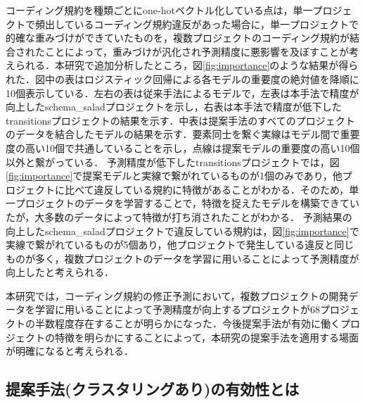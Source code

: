 \documentclass[submit,noauthor,ses,dvipdfmx]{ipsj}
\begin{document}
コーディング規約を種類ごとにone-hotベクトル化している点は，単一プロジェクトで頻出しているコーディング規約違反があった場合に，単一プロジェクトで的確な重みづけができていたものを，複数プロジェクトのコーディング規約が結合されたことによって，重みづけが汎化され予測精度に悪影響を及ぼすことが考えられる．本研究で追加分析したところ，図\ref{fig:importance}のような結果が得られた．図中の表はロジスティック回帰による各モデルの重要度の絶対値を降順に10個表示している．左右の表は従来手法によるモデルで，左表は本手法で精度が向上したschema\_saladプロジェクトを示し，右表は本手法で精度が低下したtransitionsプロジェクトの結果を示す．中表は提案手法のすべてのプロジェクトのデータを結合したモデルの結果を示す．要素同士を繋ぐ実線はモデル間で重要度の高い10個で共通していることを示し，点線は提案モデルの重要度の高い10個以外と繋がっている．
予測精度が低下したtransitionsプロジェクトでは，図\ref{fig:importance}で提案モデルと実線で繋がれているものが1個のみであり，他プロジェクトに比べて違反している規約に特徴があることがわかる．そのため，単一プロジェクトのデータを学習することで，特徴を捉えたモデルを構築できていたが，大多数のデータによって特徴が打ち消されたことがわかる．
予測結果の向上したschema\_saladプロジェクトで違反している規約は，図\ref{fig:importance}で実線で繋がれているものが5個あり，他プロジェクトで発生している違反と同じものが多く，複数プロジェクトのデータを学習に用いることによって予測精度が向上したと考えられる．

本研究では，コーディング規約の修正予測において，複数プロジェクトの開発データを学習に用いることによって予測精度が向上するプロジェクトが68プロジェクトの半数程度存在することが明らかになった．今後提案手法が有効に働くプロジェクトの特徴を明らかにすることによって，本研究の提案手法を適用する場面が明確になると考えられる．

\subsection{提案手法(クラスタリングあり)の有効性とは}
\end{document}

